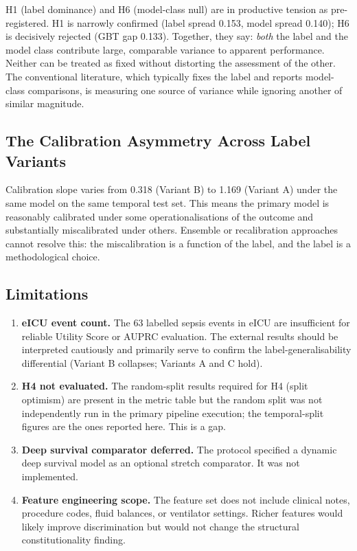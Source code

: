 H1 (label dominance) and H6 (model-class null) are in productive tension
as pre-registered. H1 is narrowly confirmed (label spread 0.153, model spread
0.140); H6 is decisively rejected (GBT gap 0.133). Together, they say:
\textit{both} the label and the model class contribute large, comparable
variance to apparent performance. Neither can be treated as fixed without
distorting the assessment of the other. The conventional literature, which
typically fixes the label and reports model-class comparisons, is measuring
one source of variance while ignoring another of similar magnitude.

\subsection{The Calibration Asymmetry Across Label Variants}

Calibration slope varies from 0.318 (Variant B) to 1.169 (Variant A) under
the same model on the same temporal test set. This means the primary model is
reasonably calibrated under some operationalisations of the outcome and
substantially miscalibrated under others. Ensemble or recalibration approaches
cannot resolve this: the miscalibration is a function of the label, and the
label is a methodological choice.

\subsection{Limitations}

\begin{enumerate}
  \item \textbf{eICU event count.} The 63 labelled sepsis events in eICU are
  insufficient for reliable Utility Score or AUPRC evaluation. The external
  results should be interpreted cautiously and primarily serve to confirm the
  label-generalisability differential (Variant B collapses; Variants A and C hold).
  \item \textbf{H4 not evaluated.} The random-split results required for H4
  (split optimism) are present in the metric table but the random split was not
  independently run in the primary pipeline execution; the temporal-split figures
  are the ones reported here. This is a gap.
  \item \textbf{Deep survival comparator deferred.} The protocol specified a
  dynamic deep survival model as an optional stretch comparator. It was not
  implemented.
  \item \textbf{Feature engineering scope.} The feature set does not include
  clinical notes, procedure codes, fluid balances, or ventilator settings.
  Richer features would likely improve discrimination but would not change
  the structural constitutionality finding.
\end{enumerate}
